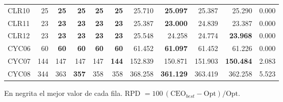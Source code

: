 \begin{table}[htbp]
\begin{tabular}{lrrrrrrrrrr}
CLR10 & 25 & \textbf{25} & \textbf{25} & \textbf{25} & \textbf{25} & 25.710 & \textbf{25.097} & 25.387 & 25.290 & 0.000 \\
CLR11 & 23 & \textbf{23} & \textbf{23} & \textbf{23} & \textbf{23} & 25.387 & \textbf{23.000} & 24.839 & 23.387 & 0.000 \\
CLR12 & 23 & \textbf{23} & \textbf{23} & \textbf{23} & \textbf{23} & 25.548 & 24.258 & 24.774 & \textbf{23.968} & 0.000 \\
CYC06 & 60 & \textbf{60} & \textbf{60} & \textbf{60} & \textbf{60} & 61.452 & \textbf{61.097} & 61.452 & 61.226 & 0.000 \\
CYC07 & 144 & 147 & 147 & 147 & \textbf{144} & 152.839 & 150.871 & 151.903 & \textbf{150.484} & 2.083 \\
CYC08 & 344 & 363 & \textbf{357} & 358 & 358 & 368.258 & \textbf{361.129} & 363.419 & 362.258 & 5.523 \\
\bottomrule
\end{tabular}

\vspace{2pt}
\begin{minipage}{\textwidth}\scriptsize
En negrita el mejor valor de cada fila. RPD $=100\,(\text{CEO}_{best}-\text{Opt})/\text{Opt}$.
\end{minipage}
\end{table}

